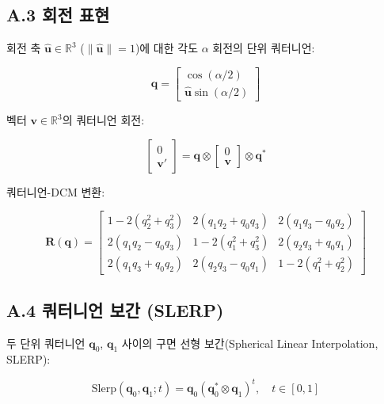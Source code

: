     \subsection*{A.3 회전 표현}
 
회전 축 $\hat{\mathbf{u}} \in \mathbb{R}^3$ ($\|\hat{\mathbf{u}}\| = 1$)에 대한
각도 $\alpha$ 회전의 단위 쿼터니언:
 
\begin{equation}
    \mathbf{q} = \begin{bmatrix} \cos(\alpha/2) \\ \hat{\mathbf{u}}\sin(\alpha/2) \end{bmatrix}
    \tag{A.9}
\end{equation}
 
벡터 $\mathbf{v} \in \mathbb{R}^3$의 쿼터니언 회전:
 
\begin{equation}
    \begin{bmatrix} 0 \\ \mathbf{v}' \end{bmatrix} =
    \mathbf{q} \otimes \begin{bmatrix} 0 \\ \mathbf{v} \end{bmatrix} \otimes \mathbf{q}^*
    \tag{A.10}
\end{equation}
 
쿼터니언-DCM 변환:
 
\begin{equation}
    \mathbf{R}(\mathbf{q}) =
    \begin{bmatrix}
        1-2(q_2^2+q_3^2) & 2(q_1q_2+q_0q_3) & 2(q_1q_3-q_0q_2) \\
        2(q_1q_2-q_0q_3) & 1-2(q_1^2+q_3^2) & 2(q_2q_3+q_0q_1) \\
        2(q_1q_3+q_0q_2) & 2(q_2q_3-q_0q_1) & 1-2(q_1^2+q_2^2)
    \end{bmatrix}
    \tag{A.11}
\end{equation}
 
\subsection*{A.4 쿼터니언 보간 (SLERP)}
 
두 단위 쿼터니언 $\mathbf{q}_0$, $\mathbf{q}_1$ 사이의
구면 선형 보간(Spherical Linear Interpolation, SLERP):
 
\begin{equation}
    \text{Slerp}(\mathbf{q}_0, \mathbf{q}_1; t) =
    \mathbf{q}_0 \left(\mathbf{q}_0^* \otimes \mathbf{q}_1\right)^t, \quad t \in [0, 1]
    \tag{A.12}
\end{equation}
 
